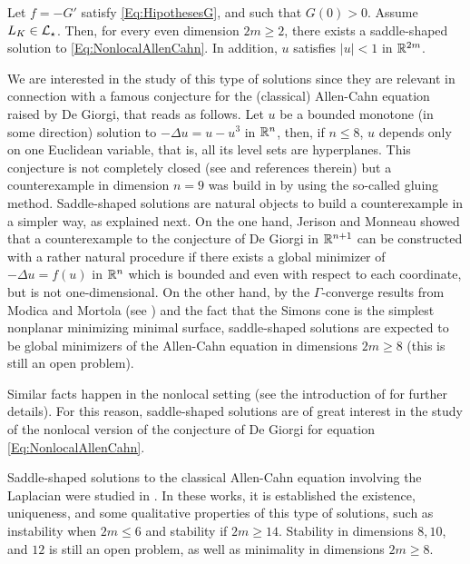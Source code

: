 \begin{theorem}
	\label{Th:Existence}
    Let $f=-G'$ satisfy \eqref{Eq:HipothesesG}, and such that $G(0)>0$. Assume $L_K\in \mathcal{L}_\star$. Then, for every even dimension $2m \geq 2$, there exists a saddle-shaped solution to \eqref{Eq:NonlocalAllenCahn}. In addition, $u$ satisfies $|u|<1$ in $\mathbb{R}^{2m}$.
\end{theorem}

We are interested in the study of this type of solutions since they are relevant in connection with a famous conjecture for the (classical) Allen-Cahn equation raised by De Giorgi, that reads as follows. Let $u$ be a bounded monotone (in some direction) solution to $-\Delta u = u - u^3$ in $\mathbb{R}^n$, then, if $n \leq 8$, $u$ depends only on one Euclidean variable, that is, all its level sets are hyperplanes. This conjecture is not completely closed (see \cite{FarinaValdinoci-DeGiorgi} and references therein) but a counterexample in dimension $n=9$ was build in \cite{delPinoKowalczykWei} by using the so-called gluing method. Saddle-shaped solutions are natural objects to build a counterexample in a simpler way, as explained next. On the one hand, Jerison and Monneau \cite{JerisonMonneau} showed that a counterexample to the conjecture of De Giorgi in $\mathbb{R}^{n+1}$ can be constructed with a rather natural procedure if there exists a global minimizer of $-\Delta u = f(u)$ in $\mathbb{R}^n$ which is bounded and even with respect to each coordinate, but is not one-dimensional. On the other hand, by the $\Gamma$-converge results from Modica and Mortola (see \cite{Modica,ModicaMortola}) and the fact that the Simons cone is the simplest nonplanar minimizing minimal surface, saddle-shaped solutions are expected to be global minimizers of the Allen-Cahn equation in dimensions $2m\geq 8$ (this is still an open problem).

Similar facts happen in the nonlocal setting (see the introduction of \cite{Felipe-Sanz-Perela:SaddleFractional} for further details). For this reason, saddle-shaped solutions are of great interest in the study of the nonlocal version of the conjecture of De Giorgi for equation \eqref{Eq:NonlocalAllenCahn}.

Saddle-shaped solutions to the classical Allen-Cahn equation involving the Laplacian were studied in \cite{DangFifePeletier, Schatzman, CabreTerraI,CabreTerraII, Cabre-Saddle}. In these works, it is established the existence, uniqueness, and some qualitative properties of this type of solutions, such as instability when $2m\leq 6$ and stability if $2m\geq 14$. Stability in dimensions $8, 10$, and $12$ is still an open problem, as well as minimality in dimensions $2m\geq 8$.

